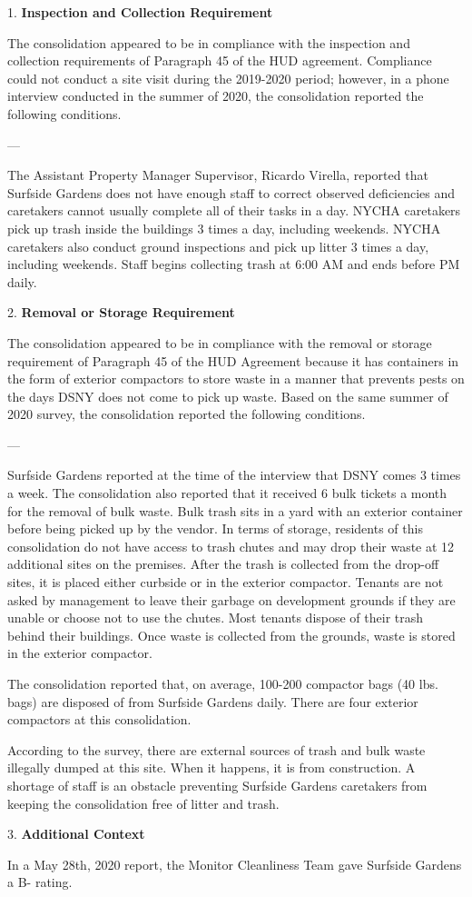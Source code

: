

1. \textbf{Inspection and Collection Requirement}

The consolidation appeared to be in compliance with the inspection and collection requirements of Paragraph 45 of the HUD agreement. Compliance could not conduct a site visit during the 2019-2020 period; however, in a phone interview conducted in the summer of 2020, the consolidation reported the following conditions.

---

The Assistant Property Manager Supervisor, Ricardo Virella, reported that Surfside Gardens does not have enough staff to correct observed deficiencies and caretakers cannot usually complete all of their tasks in a day. NYCHA caretakers pick up trash inside the buildings 3 times a day, including weekends. NYCHA caretakers also conduct ground inspections and pick up litter 3 times a day, including weekends. Staff begins collecting trash at 6:00 AM and ends before   PM daily. 

2. \textbf{Removal or Storage Requirement}

The consolidation appeared to be in compliance with the removal or storage requirement of Paragraph 45 of the HUD Agreement because it has containers in the form of exterior compactors to store waste in a manner that prevents pests on the days DSNY does not come to pick up waste. Based on the same summer of 2020 survey, the consolidation reported the following conditions.

---

Surfside Gardens reported at the time of the interview that DSNY comes 3 times a week. The consolidation also reported that it received 6 bulk tickets a month for the removal of bulk waste. Bulk trash sits in a yard with an exterior container before being picked up by the vendor. In terms of storage, residents of this consolidation do not have access to trash chutes and may drop their waste at 12 additional sites on the premises. After the trash is collected from the drop-off sites, it is placed either curbside or in the exterior compactor. Tenants are not asked by management to leave their garbage on development grounds if they are unable or choose not to use the chutes. Most tenants dispose of their trash behind their buildings. Once waste is collected from the grounds, waste is stored in the exterior compactor.

The consolidation reported that, on average, 100-200 compactor bags (40 lbs. bags) are disposed of from Surfside Gardens daily. There are four exterior compactors at this consolidation.

According to the survey, there are external sources of trash and bulk waste illegally dumped at this site. When it happens, it is from construction. A shortage of staff is an obstacle preventing Surfside Gardens caretakers from keeping the consolidation free of litter and trash. 

3. \textbf{Additional Context}

In a May 28th, 2020 report, the Monitor Cleanliness Team gave Surfside Gardens a B- rating.